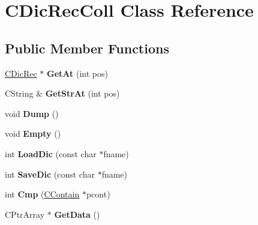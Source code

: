 \hypertarget{class_c_dic_rec_coll}{\section{C\-Dic\-Rec\-Coll Class Reference}
\label{class_c_dic_rec_coll}
}
\subsection*{Public Member Functions}
\begin{DoxyCompactItemize}
\item 
\hypertarget{class_c_dic_rec_coll_aebfbd2e534bcc5f2138b557d7ae44a3a}{\hyperlink{class_c_dic_rec}{C\-Dic\-Rec} $\ast$ {\bfseries Get\-At} (int pos)}\label{class_c_dic_rec_coll_aebfbd2e534bcc5f2138b557d7ae44a3a}

\item 
\hypertarget{class_c_dic_rec_coll_a5564af83fff757362fcee2c9235b1023}{C\-String \& {\bfseries Get\-Str\-At} (int pos)}\label{class_c_dic_rec_coll_a5564af83fff757362fcee2c9235b1023}

\item 
\hypertarget{class_c_dic_rec_coll_ac11d407ff28d22dd189aa720a06b3532}{void {\bfseries Dump} ()}\label{class_c_dic_rec_coll_ac11d407ff28d22dd189aa720a06b3532}

\item 
\hypertarget{class_c_dic_rec_coll_ab1884bdc9a93eef4ee36629cd3648009}{void {\bfseries Empty} ()}\label{class_c_dic_rec_coll_ab1884bdc9a93eef4ee36629cd3648009}

\item 
\hypertarget{class_c_dic_rec_coll_a57e02297251e8c5e12119455c9e2fea3}{int {\bfseries Load\-Dic} (const char $\ast$fname)}\label{class_c_dic_rec_coll_a57e02297251e8c5e12119455c9e2fea3}

\item 
\hypertarget{class_c_dic_rec_coll_a4430f9caba0a2173089272377743da1b}{int {\bfseries Save\-Dic} (const char $\ast$fname)}\label{class_c_dic_rec_coll_a4430f9caba0a2173089272377743da1b}

\item 
\hypertarget{class_c_dic_rec_coll_aa2afe03283dc9b25b312c953f6cb2905}{int {\bfseries Cmp} (\hyperlink{class_c_contain}{C\-Contain} $\ast$pcont)}\label{class_c_dic_rec_coll_aa2afe03283dc9b25b312c953f6cb2905}

\item 
\hypertarget{class_c_dic_rec_coll_a46b696c4bc5f3223f25cc83cb7949d3c}{C\-Ptr\-Array $\ast$ {\bfseries Get\-Data} ()}\label{class_c_dic_rec_coll_a46b696c4bc5f3223f25cc83cb7949d3c}

\end{DoxyCompactItemize}
